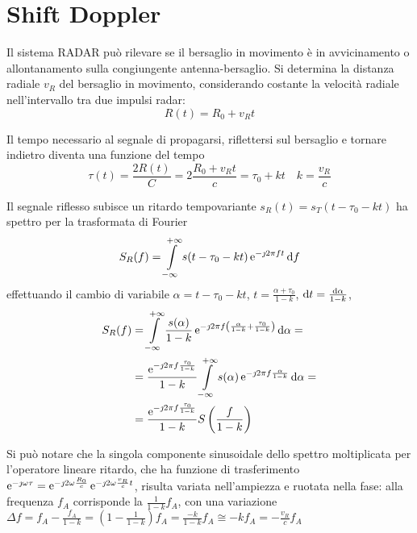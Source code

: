 \clearpage
\section{Shift Doppler}
Il sistema \ac{RADAR} può rilevare se il bersaglio in movimento è in avvicinamento o allontanamento sulla congiungente antenna-bersaglio. Si determina la distanza radiale $v_R$ del bersaglio in movimento, considerando costante la velocità radiale nell'intervallo tra due impulsi radar:
\begin{equation}
R(t)=R_0+v_R t
\end{equation}

Il tempo necessario al segnale di propagarsi, riflettersi sul bersaglio e tornare indietro diventa una funzione del tempo
\begin{equation}
\tau(t)=\frac{2 R(t)}{C}=2\frac{R_0+v_R t}{c}=\tau_0+k t\quad k=\frac{v_R}{c}
\end{equation}

Il segnale riflesso subisce un ritardo tempovariante $s_R(t)=s_T(t-\tau_0-k t)$ ha spettro per la trasformata di Fourier
\[S_R(f)=\int\limits_{-\infty}^{+\infty}{s(t-\tau_0-k t)\operatorname{e}^{-\jmath 2\pi f t}}{\,\mathop{}\!\mathrm{d}{f}}\]
effettuando il cambio di variabile $\alpha=t-\tau_0-k t$, $t=\frac{\alpha+\tau_0}{1-k}$, $\mathop{}\!\mathrm{d} t=\frac{\mathop{}\!\mathrm{d}\alpha}{1-k}$,
\[\begin{split}S_R(f)&=\int\limits_{-\infty}^{+\infty}{\frac{s(\alpha)}{1-k}\operatorname{e}^{-\jmath 2\pi f\left(\frac{\alpha}{1-k}+\frac{\tau_0}{1-k}\right)}}{\,\mathop{}\!\mathrm{d}{\alpha}}=\\
&=\frac{\operatorname{e}^{-\jmath 2\pi f\frac{\tau_0}{1-k}}}{1-k}\int\limits_{-\infty}^{+\infty}{s(\alpha)\operatorname{e}^{-\jmath 2\pi f\frac{\alpha}{1-k}}}{\,\mathop{}\!\mathrm{d}{\alpha}}=\\
&=\frac{\operatorname{e}^{-\jmath 2\pi f\frac{\tau_0}{1-k}}}{1-k} S\left(\frac{f}{1-k}\right)\end{split}\]

Si può notare che la singola componente sinusoidale dello spettro moltiplicata per l'operatore lineare ritardo, che ha funzione di trasferimento $\operatorname{e}^{-\jmath\omega\tau}=\operatorname{e}^{-\jmath 2\omega\frac{R_0}{c}}\operatorname{e}^{-\jmath 2\omega\frac{v_R}{c}t}$, risulta variata nell'ampiezza e ruotata nella fase: alla frequenza $f_A$ corrisponde la $\frac{1}{1-k}f_A$, con una variazione $\Delta f=f_A-\frac{f_A}{1-k}=\left(1-\frac{1}{1-k}\right)f_A=\frac{-k}{1-k}f_A\cong-k f_A=-\frac{v_R}{c}f_A$

